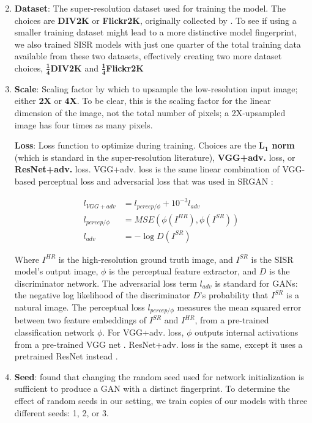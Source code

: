 \documentclass[10pt]{article} %
\begin{document}
\begin{enumerate}
    \setcounter{enumi}{1}
    \item \textbf{Dataset}: The super-resolution dataset used for training the model. The choices are \textbf{DIV2K} \citep{Agustsson_2017_CVPR_Workshops} or \textbf{Flickr2K}, originally collected by \cite{lim2017enhanced}. To see if using a smaller training dataset might lead to a more distinctive model fingerprint, we also trained SISR models with just one quarter of the total training data available from these two datasets, effectively creating two more dataset choices, \textbf{$\bm{\frac{1}{4}}$DIV2K} and \textbf{$\bm{\frac{1}{4}}$Flickr2K}
    
    \item \textbf{Scale}: Scaling factor by which to upsample the low-resolution input image; either \textbf{2X} or \textbf{4X}. To be clear, this is the scaling factor for the linear dimension of the image, not the total number of pixels; a 2X-upsampled image has four times as many pixels. 

    
     \textbf{Loss}: Loss function to optimize during training. Choices are the \textbf{$\bm{L_1}$ norm} (which is standard in the super-resolution literature), \textbf{VGG+adv.} loss, or \textbf{ResNet+adv.} loss. VGG+adv. loss is the same linear combination of VGG-based perceptual loss and adversarial loss that was used in SRGAN \citep{wang2018esrgan}: 

    \begin{align*} 
        l_{VGG+adv} &= l_{percep/\phi} + 10^{-3}l_{adv} \\
        l_{percep/\phi} &= MSE(\phi(I^{HR}),\phi(I^{SR})) \\
        l_{adv} &= - \log D(I^{SR})
    \end{align*}
    
    Where $I^{HR}$ is the high-resolution ground truth image, and $I^{SR}$ is the SISR model's output image, $\phi$ is the perceptual feature extractor, and $D$ is the discriminator network. The adversarial loss term $l_{adv} $ is standard for GANs: the negative log likelihood of the discriminator $D$'s probability that $I^{SR}$ is a natural image. The perceptual loss $l_{percep/\phi}$ measures the mean squared error between two feature embeddings of $I^{SR}$ and $I^{HR}$, from a pre-trained classification network $\phi$.
    For VGG+adv. loss, $\phi$ outputs internal activations from a pre-trained VGG net \citep{simonyan2014very}. ResNet+adv. loss is the same, except it uses a pretrained ResNet instead \citep{he2016deep}.
        
    \item \textbf{Seed}: \cite{yu2019attributing} found that changing the random seed used for network initialization is sufficient to produce a GAN with a distinct fingerprint. To determine the effect of random seeds in our setting, we train copies of our models with three different seeds: 1, 2, or 3.
\end{enumerate}
\end{document}
